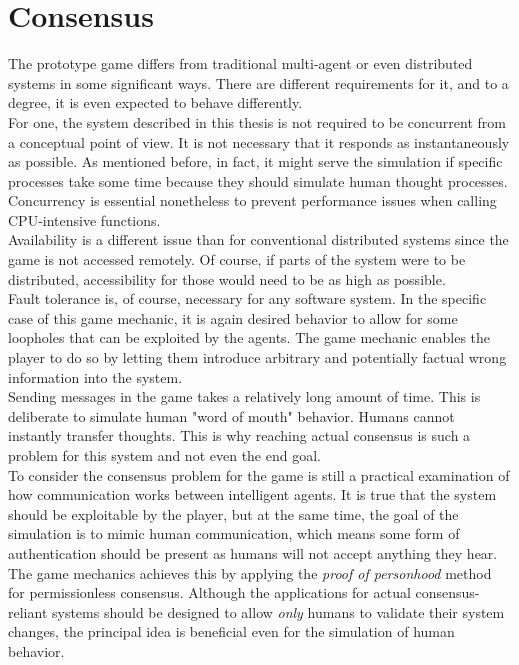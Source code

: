 \section{Consensus}
The prototype game differs from traditional multi-agent or even distributed systems in some significant ways. There are different requirements for it, and to a degree, it is even expected to behave differently.\\
For one, the system described in this thesis is not required to be concurrent from a conceptual point of view. It is not necessary that it responds as instantaneously as possible. As mentioned before, in fact,  it might serve the simulation if specific processes take some time because they should simulate human thought processes. Concurrency is essential nonetheless to prevent performance issues when calling CPU-intensive functions.\\
Availability is a different issue than for conventional distributed systems since the game is not accessed remotely. Of course, if parts of the system were to be distributed, accessibility for those would need to be as high as possible.\\
Fault tolerance is, of course, necessary for any software system. In the specific case of this game mechanic, it is again desired behavior to allow for some loopholes that can be exploited by the agents. The game mechanic enables the player to do so by letting them introduce arbitrary and potentially factual wrong information into the system.\\
Sending messages in the game takes a relatively long amount of time. This is deliberate to simulate human "word of mouth" behavior. Humans cannot instantly transfer thoughts. This is why reaching actual consensus is such a problem for this system and not even the end goal.\\
To consider the consensus problem for the game is still a practical examination of how communication works between intelligent agents. It is true that the system should be exploitable by the player, but at the same time, the goal of the simulation is to mimic human communication, which means some form of authentication should be present as humans will not accept anything they hear.\\
The game mechanics achieves this by applying the \textit{proof of personhood} method for permissionless consensus. Although the applications for actual consensus-reliant systems should be designed to allow \textit{only} humans to validate their system changes, the principal idea is beneficial even for the simulation of human behavior.\\
